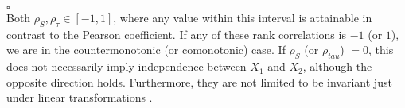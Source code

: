 \hfill $\square$ \\


Both $\rho_S, \rho_{\tau} \in [-1,1]$, where any value within this interval is attainable in contrast to the Pearson coefficient. 
If any of these rank correlations is $-1$ (or $1$), we are in the countermonotonic (or comonotonic) case. If $\rho_S$ (or $\rho_{tau}$) $=0$, this does not necessarily imply independence between $X_1$ and $X_2$, although the opposite direction holds.
Furthermore, they are not limited to be invariant just under linear transformations . 










